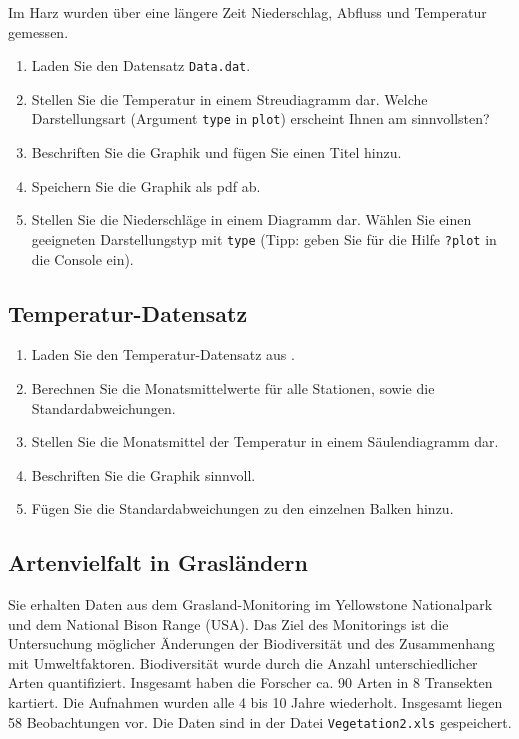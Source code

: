 \documentclass[]{book}
\providecommand{\tightlist}{%
  \setlength{\itemsep}{0pt}\setlength{\parskip}{0pt}}
\begin{document}
Im Harz wurden über eine längere Zeit Niederschlag, Abfluss und Temperatur gemessen.

\begin{enumerate}
\def\labelenumi{\arabic{enumi}.}
\tightlist
\item
  Laden Sie den Datensatz \texttt{Data.dat}.
\item
  Stellen Sie die Temperatur in einem Streudiagramm dar. Welche Darstellungsart (Argument \texttt{type} in \texttt{plot}) erscheint Ihnen am sinnvollsten?
\item
  Beschriften Sie die Graphik und fügen Sie einen Titel hinzu.
\item
  Speichern Sie die Graphik als pdf ab.
\item
  Stellen Sie die Niederschläge in einem Diagramm dar. Wählen Sie einen geeigneten Darstellungstyp mit \texttt{type} (Tipp: geben Sie für die Hilfe \texttt{?plot} in die Console ein).
\end{enumerate}

\hypertarget{temperatur-datensatz}{%
\subsection{Temperatur-Datensatz}\label{temperatur-datensatz}}

\begin{enumerate}
\def\labelenumi{\arabic{enumi}.}
\tightlist
\item
  Laden Sie den Temperatur-Datensatz aus \citet{Zuur2009a}.
\item
  Berechnen Sie die Monatsmittelwerte für alle Stationen, sowie die Standardabweichungen.
\item
  Stellen Sie die Monatsmittel der Temperatur in einem Säulendiagramm dar.
\item
  Beschriften Sie die Graphik sinnvoll.
\item
  Fügen Sie die Standardabweichungen zu den einzelnen Balken hinzu.
\end{enumerate}

\hypertarget{artenvielfalt-in-grasluxe4ndern}{%
\subsection{Artenvielfalt in Grasländern}\label{artenvielfalt-in-grasluxe4ndern}}

Sie erhalten Daten aus dem Grasland-Monitoring im Yellowstone Nationalpark und dem National Bison Range (USA). Das Ziel des Monitorings ist die Untersuchung möglicher Änderungen der Biodiversität und des Zusammenhang mit Umweltfaktoren. Biodiversität wurde durch die Anzahl unterschiedlicher Arten quantifiziert. Insgesamt haben die Forscher ca. 90 Arten in 8 Transekten kartiert. Die Aufnahmen wurden alle 4 bis 10 Jahre wiederholt. Insgesamt liegen 58 Beobachtungen vor. Die Daten sind in der Datei \texttt{Vegetation2.xls} gespeichert.
\end{document}
